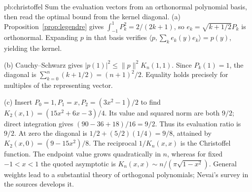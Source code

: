 \begin{solution}{pb:christoffel}
\idea Sum the evaluation vectors from an orthonormal polynomial basis, then read the optimal bound from the kernel diagonal.
\writeup (a) Proposition~\ref{prop:legendre} gives $\int_{-1}^1P_k^2=2/(2k+1)$, so $e_k=\sqrt{k+1/2}P_k$ is orthonormal. Expanding $p$ in that basis verifies $\langle p,\sum_ke_k(y)e_k\rangle=p(y)$, yielding the kernel.

(b) Cauchy--Schwarz gives $|p(1)|^2\le\|p\|^2K_n(1,1)$. Since $P_k(1)=1$, the diagonal is $\sum_{k=0}^n(k+1/2)=(n+1)^2/2$. Equality holds precisely for multiples of the representing vector.

(c) Insert $P_0=1,P_1=x,P_2=(3x^2-1)/2$ to find $K_2(x,1)=(15x^2+6x-3)/4$. Its value and squared norm are both $9/2$; direct integration gives $(90-36+18)/16=9/2$. Thus its evaluation ratio is $9/2$. At zero the diagonal is $1/2+(5/2)(1/4)=9/8$, attained by $K_2(x,0)=(9-15x^2)/8$.
\leads The reciprocal $1/K_n(x,x)$ is the Christoffel function. The endpoint value grows quadratically in $n$, whereas for fixed $-1<x<1$ the quoted asymptotic is $K_n(x,x)\sim n/(\pi\sqrt{1-x^2})$. General weights lead to a substantial theory of orthogonal polynomials; Nevai's survey in the sources develops it.
\end{solution}

